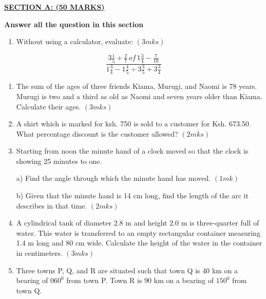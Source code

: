 \documentclass[
  a4paperpaper,
]{scrbook}
\providecommand{\tightlist}{%
  \setlength{\itemsep}{0pt}\setlength{\parskip}{0pt}}\usepackage{longtable,booktabs,array}
\begin{document}
\begin{tcolorbox}[enhanced jigsaw, left=2mm, colframe=quarto-callout-note-color-frame, toptitle=1mm, opacitybacktitle=0.6, rightrule=.15mm, colbacktitle=quarto-callout-note-color!10!white, colback=white, arc=.35mm, breakable, leftrule=.75mm, bottomtitle=1mm, bottomrule=.15mm, title=\textcolor{quarto-callout-note-color}{\faInfo}\hspace{0.5em}{Model Sample Paper 10}, titlerule=0mm, coltitle=black, toprule=.15mm, opacityback=0]

\ul{\textbf{SECTION A: (50 MARKS)}}

\textbf{Answer all the question in this section}

\begin{enumerate}
\def\labelenumi{\arabic{enumi}.}
\tightlist
\item
  Without using a calculator, evaluate: \((3mks)\)
\end{enumerate}

\[\frac{3\frac{1}{5}+\frac{2}{7}\,of\,1\frac{3}{4}-\frac{7}{10}}{1\frac{3}{4}-1\frac{4}{5}\div3\frac{3}{5}+3\frac{3}{4}}\]

\begin{enumerate}
\def\labelenumi{\arabic{enumi}.}
\setcounter{enumi}{1}
\item
  The sum of the ages of three friends Kiama, Murugi, and Naomi is 78
  years. Murugi is two and a third as old as Naomi and seven years older
  than Kiama. Calculate their ages. \((3mks)\)
\item
  A shirt which is marked for ksh. 750 is sold to a customer for Ksh.
  673.50. What percentage discount is the customer allowed? \((2mks)\)
\item
  Starting from noon the minute hand of a clock moved so that the clock
  is showing 25 minutes to one.

  a) Find the angle through which the minute hand has moved. \((1mk)\)

  b) Given that the minute hand is 14 cm long, find the length of the
  arc it describes in that time. \((2mks)\)
\item
  A cylindrical tank of diameter 2.8 m and height 2.0 m is three-quarter
  full of water. This water is transferred to an empty rectangular
  container measuring 1.4 m long and 80 cm wide. Calculate the height of
  the water in the container in centimeters. \((3mks)\)
\item
  Three towns P, Q, and R are situated such that town Q is 40 km on a
  bearing of \(060^0\) from town P. Town R is 90 km on a bearing of
  \(150^0\) from town Q.


\end{enumerate}
\end{tcolorbox}
\end{document}
